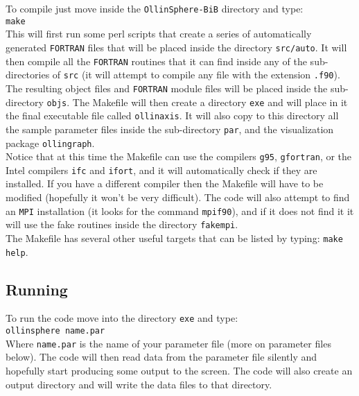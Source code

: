 \documentclass[12pt]{article}
\begin{document}
To compile just move inside the \texttt{OllinSphere-BiB} directory and type: \\

\texttt{make} \\

This will first run some perl scripts that create a series of
automatically generated \texttt{FORTRAN} files that will be placed
inside the directory \texttt{src/auto}.  It will then compile all the
\texttt{FORTRAN} routines that it can find inside any of the
sub-directories of \texttt{src} (it will attempt to compile any file
with the extension \texttt{.f90}). \\

The resulting object files and \texttt{FORTRAN} module files will be
placed inside the sub-directory \texttt{objs}. The Makefile will then
create a directory \texttt{exe} and will place in it the final
executable file called \texttt{ollinaxis}.  It will also copy to this
directory all the sample parameter files inside the sub-directory
\texttt{par}, and the visualization package \texttt{ollingraph}. \\

Notice that at this time the Makefile can use the compilers
\texttt{g95}, \texttt{gfortran}, or the Intel compilers \texttt{ifc}
and \texttt{ifort}, and it will automatically check if they are
installed. If you have a different compiler then the Makefile will
have to be modified (hopefully it won't be very difficult). The code
will also attempt to find an \texttt{MPI} installation (it looks for
the command \texttt{mpif90}), and if it does not find it it will use
the fake routines inside the directory \texttt{fakempi}. \\

The Makefile has several other useful targets that can be listed by
typing: \texttt{make help}. \\


\subsection{Running}
\label{sec:running}

To run the code move into the directory \texttt{exe} and type: \\

\texttt{ollinsphere name.par} \\

Where \texttt{name.par} is the name of your parameter file (more on
parameter files below).  The code will then read data from the
parameter file silently and hopefully start producing some output to
the screen. The code will also create an output directory and will
write the data files to that directory. \\
\end{document}
